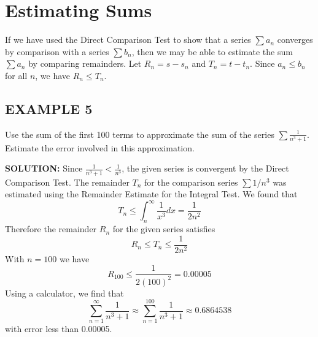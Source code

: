 \documentclass{article}
\theoremstyle{mystyle}
\begin{document}
\section*{Estimating Sums}
If we have used the Direct Comparison Test to show that a series \( \sum a_n \) converges by comparison with a series \( \sum b_n \), then we may be able to estimate the sum \( \sum a_n \) by comparing remainders. Let \(R_n = s - s_n\) and \(T_n = t - t_n\). Since \(a_n \le b_n\) for all \(n\), we have \(R_n \le T_n\).

\subsection*{EXAMPLE 5}
Use the sum of the first 100 terms to approximate the sum of the series \( \sum \frac{1}{n^3 + 1} \). Estimate the error involved in this approximation.

\textbf{SOLUTION:}
Since $\frac{1}{n^3 + 1} < \frac{1}{n^3}$, the given series is convergent by the Direct Comparison Test. The remainder $T_n$ for the comparison series $\sum 1/n^3$ was estimated using the Remainder Estimate for the Integral Test. We found that
\[ T_n \le \int_n^\infty \frac{1}{x^3} dx = \frac{1}{2n^2} \]
Therefore the remainder $R_n$ for the given series satisfies
\[ R_n \le T_n \le \frac{1}{2n^2} \]
With $n=100$ we have
\[ R_{100} \le \frac{1}{2(100)^2} = 0.00005 \]
Using a calculator, we find that
\[ \sum_{n=1}^{\infty} \frac{1}{n^3 + 1} \approx \sum_{n=1}^{100} \frac{1}{n^3 + 1} \approx 0.6864538 \]
with error less than 0.00005.
\end{document}
